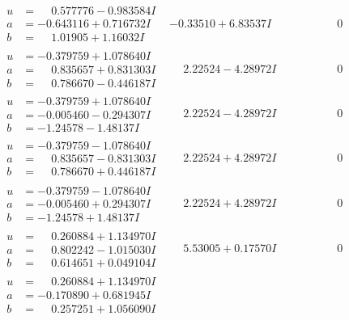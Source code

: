 \documentclass[1p]{elsarticle_modified}
\theoremstyle{definition}
\begin{document}
$$\begin{array}{c|c|c}
\begin{aligned}
u &= \phantom{-}0.577776 - 0.983584 I \\
a &= -0.643116 + 0.716732 I \\
b &= \phantom{-}1.01905 + 1.16032 I\end{aligned}
 & -0.33510 + 6.83537 I & \phantom{-0.000000 } 0 \\ \hline\begin{aligned}
u &= -0.379759 + 1.078640 I \\
a &= \phantom{-}0.835657 + 0.831303 I \\
b &= \phantom{-}0.786670 - 0.446187 I\end{aligned}
 & \phantom{-}2.22524 - 4.28972 I & \phantom{-0.000000 } 0 \\ \hline\begin{aligned}
u &= -0.379759 + 1.078640 I \\
a &= -0.005460 - 0.294307 I \\
b &= -1.24578 - 1.48137 I\end{aligned}
 & \phantom{-}2.22524 - 4.28972 I & \phantom{-0.000000 } 0 \\ \hline\begin{aligned}
u &= -0.379759 - 1.078640 I \\
a &= \phantom{-}0.835657 - 0.831303 I \\
b &= \phantom{-}0.786670 + 0.446187 I\end{aligned}
 & \phantom{-}2.22524 + 4.28972 I & \phantom{-0.000000 } 0 \\ \hline\begin{aligned}
u &= -0.379759 - 1.078640 I \\
a &= -0.005460 + 0.294307 I \\
b &= -1.24578 + 1.48137 I\end{aligned}
 & \phantom{-}2.22524 + 4.28972 I & \phantom{-0.000000 } 0 \\ \hline\begin{aligned}
u &= \phantom{-}0.260884 + 1.134970 I \\
a &= \phantom{-}0.802242 - 1.015030 I \\
b &= \phantom{-}0.614651 + 0.049104 I\end{aligned}
 & \phantom{-}5.53005 + 0.17570 I & \phantom{-0.000000 } 0 \\ \hline\begin{aligned}
u &= \phantom{-}0.260884 + 1.134970 I \\
a &= -0.170890 + 0.681945 I \\
b &= \phantom{-}0.257251 + 1.056090 I\end{aligned}

\end{array}$$
\end{document}
